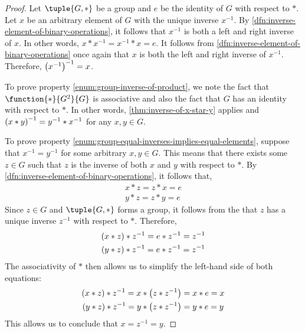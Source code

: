 \begin{proof}
    Let \( \tuple{G,\ast} \) be a group and \( e \) be the identity of \( G \) with respect to \( \ast \).
    Let \( x \) be an arbitrary element of \( G \) with the unique inverse \( x^{-1} \). By \cref{dfn:inverse-element-of-binary-operations},
    it follows that \( x^{-1} \) is both a left and right inverse of \( x \). In other words, \( x \ast x^{-1} = x^{-1} \ast x = e \). It follows
    from \cref{dfn:inverse-element-of-binary-operations} once again that \( x \) is both the left and right inverse of \( x^{-1} \). Therefore,
    \( \mleft( x^{-1} \mright)^{-1} = x \).

    \vspace{0.3cm}
    \noindent
    To prove property \ref{enum:group-inverse-of-product}, we note the fact that \( \function{\ast}{G^{2}}{G} \) is associative and also the fact that
    \( G \) has an identity with respect to \( \ast \). In other words, \cref{thm:inverse-of-x-star-y} applies and \( \mleft( x \ast y \mright)^{-1} = y^{-1} \ast x^{-1} \)
    for any \( x, y \in G \).

    \vspace{0.3cm}
    \noindent
    To prove property \ref{enum:group-equal-inverses-implies-equal-elements}, suppose that
    \( x^{-1} = y^{-1} \) for some arbitrary \( x,y \in G \). This means that there exists
    some \( z \in G \) such that \( z \) is the inverse of both \( x \) and \( y \) with
    respect to \( \ast \). By \cref{dfn:inverse-element-of-binary-operations}, it follows that,
    \begin{gather*}
        x \ast z = z \ast x = e\\
        y \ast z = z \ast y = e
    \end{gather*}
    Since \( z \in G \) and \( \tuple{G,\ast} \) forms a group,
    it follows from the  that \( z \) has a unique inverse \( z^{-1} \) with respect to \( \ast \).
    Therefore,
    \begin{gather*}
        \mleft( x \ast z \mright) \ast z^{-1} = e \ast z^{-1} = z^{-1}\\
        \mleft( y \ast z \mright) \ast z^{-1} = e \ast z^{-1} = z^{-1}
    \end{gather*}
    The associativity of \( \ast \) then allows us to simplify the left-hand side of both equations:
    \begin{gather*}
        \mleft( x \ast z \mright) \ast z^{-1} = x \ast \mleft( z \ast z^{-1} \mright) = x \ast e = x\\
        \mleft( y \ast z \mright) \ast z^{-1} = y \ast \mleft( z \ast z^{-1} \mright) = y \ast e = y
    \end{gather*}
    This allows us to conclude that \( x = z^{-1} = y \).


\end{proof}
